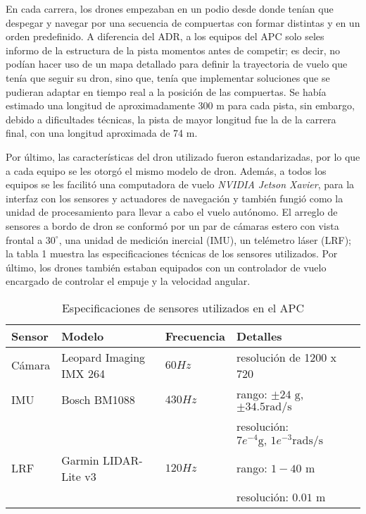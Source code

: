 En cada carrera, los drones empezaban en un podio desde donde tenían que despegar y navegar por una secuencia de compuertas con formar distintas y en un orden predefinido. A diferencia del ADR, a los equipos del APC solo seles informo de la estructura de la pista momentos antes de competir; es decir, no podían hacer uso de un mapa detallado para definir la trayectoria de vuelo que tenía que seguir su dron, sino que, tenía que implementar soluciones que se pudieran adaptar en tiempo real a la posición de las compuertas. Se había estimado una longitud de aproximadamente 300 m para cada pista, sin embargo, debido a dificultades técnicas, la pista de mayor longitud fue la de la carrera final, con una longitud aproximada de 74 m\cite{foehn2020alphapilot}.   

Por último, las características del dron utilizado fueron estandarizadas, por lo que a cada equipo se les otorgó el mismo modelo de dron. Además, a todos los equipos se les facilitó una computadora de vuelo \textit{NVIDIA Jetson Xavier}, para la interfaz con los sensores y actuadores de navegación y también fungió como la unidad de procesamiento para llevar a cabo el vuelo autónomo. El arreglo de sensores a bordo de dron se conformó por un par de cámaras estero con  vista frontal a $30^\circ$, una unidad de medición inercial (IMU), un telémetro láser (LRF); la tabla 1 muestra las especificaciones técnicas de los sensores utilizados. Por último, los drones también estaban equipados con un controlador de vuelo encargado de controlar el empuje y la velocidad angular.

\begin{table}
    \centering
    \begin{tabular}{llll}
        \hline
        Sensor & Modelo & Frecuencia & Detalles\\
        \hline
        Cámara & Leopard Imaging IMX 264 & $60 Hz$ & resolución de 1200 x 720\\
        IMU & Bosch BM1088 & $430 Hz$ & rango: $\pm 24 \text{ g}$, $\pm 34.5 \text{rad/s}$\\
         & & & resolución: $7e^{-4}\text{g, } 1e^{-3}\text{rads/s}$\\
        LRF & Garmin LIDAR-Lite v3 & $120 Hz$ & rango: $1-40$ m\\
        & & & resolución: $0.01 \text{ m}$\\
        \hline
    \end{tabular}
    \label{tab:sensors}
    \caption{Especificaciones de sensores utilizados en el APC \cite{foehn2020alphapilot}}
\end{table}

